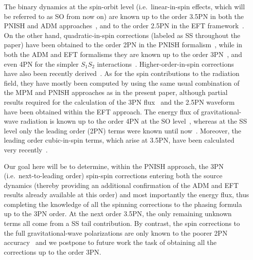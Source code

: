 \documentclass[
superscriptaddress,
preprint,
prd,tightenlines,showpacs,nofootinbib,
eqsecnum,
amsfonts,amsmath,amssymb]{revtex4-1}
\begin{document}
The binary dynamics at the spin-orbit level (i.e.\ linear-in-spin effects,
which will be referred to as SO from now on) are known up to the order 3.5PN
in both the PNISH and ADM
approaches~\cite{FBB06,MBFB13,BMFB13,DJSspin,HS11so,HSS13}, and to the order
2.5PN in the EFT framework~\cite{Porto10,Levi10}. On the other hand,
quadratic-in-spin corrections (labeled as SS throughout the paper) have been
obtained to the order 2PN in the PNISH formalism~\cite{KWW93,Poisson97,BFH12},
while in both the ADM and EFT formalisms they are known up to the order
3PN~\cite{HS11ss,PR08b,HSS12,LS14a}, and even 4PN for the simpler $S_1 S_2$
interactions~\cite{HS11ss,PR08a,Levi08,Levi12}. Higher-order-in-spin
corrections have also been recently derived~\cite{HS07,HS08,Marsat15,LS14a}.
As for the spin contributions to the radiation field, they have mostly been
computed by using the same usual combination of the MPM and PNISH approaches as
in the present paper, although partial results required for the calculation of
the 3PN flux~\cite{PRR10} and the 2.5PN waveform~\cite{PRR12} have been
obtained within the EFT approach. The energy flux of gravitational-wave
radiation is known up to the order 4PN at the SO
level~\cite{BBF06,BMB13,MBBB13}, whereas at the SS level only the leading
order (2PN) terms were known until now~\cite{BFH12}. Moreover, the leading
order cubic-in-spin terms, which arise at 3.5PN, have been calculated very
recently~\cite{Marsat15}.

Our goal here will be to determine, within the PNISH approach, the 3PN
(i.e.\ next-to-leading order) spin-spin corrections entering both the source
dynamics (thereby providing an additional confirmation of the ADM and EFT
results already available at this order) and most importantly the energy flux,
thus completing the knowledge of all the spinning corrections to the phasing
formula up to the 3PN order. At the next order 3.5PN, the only remaining
unknown terms all come from a SS tail contribution. By contrast, the spin
corrections to the full gravitational-wave polarizations are only known to the
poorer 2PN accuracy~\cite{ABFO09,BFH12} and we postpone to future work the
task of obtaining all the corrections up to the order 3PN.
\end{document}
